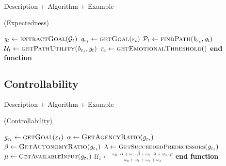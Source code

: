 \documentclass[letterpaper]{article}
\begin{document}
Description + Algorithm + Example

\begin{algorithm}
	\caption{(Expectedness)}
	\label{array-sum}
	\begin{algorithmic}[1]
			\Statex
			\State $\mathit{g}_{t} \gets \Call{extractGoal}{\mathcal{G}_{t}}$
			\State $\mathit{g}_{\varepsilon_t} \gets \Call{getGoal}{\varepsilon_t}$
			\Statex
				\State {}
			\Else
					\State {}
				\Else
					\State $\mathcal{P}_{t} \gets \Call{findPath}{\mathit{b}_{\varepsilon_t},
					\mathit{g}_{t}}$
						\State {}
					\Else
						\State $\mathcal{U}_{t} \gets
						\Call{getPathUtility}{\mathit{b}_{\varepsilon_t}, \mathit{g}_{t}}$
						\State $\tau_{e} \gets \Call{getEmotionalThreshold}{ }$
							\State {}
						\Else
							\State {}
						\EndIf
					\EndIf
				\EndIf
			\EndIf
		\EndFunction
		\State \textbf{end function}
	\end{algorithmic}
\end{algorithm}

\subsection{Controllability}

Description + Algorithm + Example

\begin{algorithm}
	\caption{(Controllability)}
	\label{array-sum}
	\begin{algorithmic}[1]
			\Statex
			\State $\mathit{g}_{\varepsilon_t} \gets \Call{getGoal}{\varepsilon_t}$ 
			\Statex
			\State $\alpha \gets \Call{GetAgencyRatio}{\mathit{g}_{\varepsilon_t}}$ 
			\State $\beta \gets \Call{GetAutonomyRatio}{\mathit{g}_{\varepsilon_t}}$
			\Statex
			\State $\lambda \gets
			\Call{\small{GetSucceededPredecessors}}{\mathit{g}_{\varepsilon_t}}$
			\State $\mu \gets
			\Call{\small{GetAvailableInput}}{\mathit{g}_{\varepsilon_t}}$
			\Statex
			\State $\mathcal{U}_{t} \gets
			\frac{\omega_{0}\cdot \alpha + \omega_{1}\cdot \beta + \omega_{2}\cdot
			\lambda + \omega_{3}\cdot \mu}{\omega_{0} + \omega_{1} + \omega_{2} +
			\omega_{3}}$
			\Statex
				\State {}
			\Else
				\State {}
			\EndIf
		\EndFunction
		\State \textbf{end function}
	\end{algorithmic}
\end{algorithm}
\end{document}
